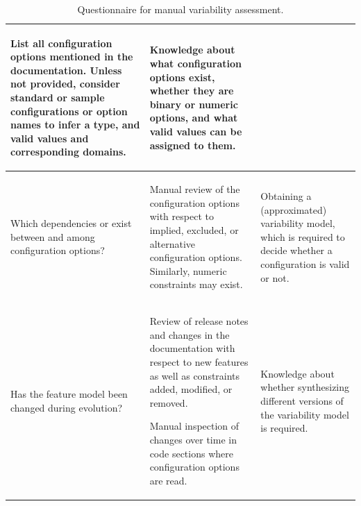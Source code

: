 \begin{table}
\begin{tabular}{L{0.22\textwidth} L{0.48\textwidth} L{0.3\textwidth}}
	{\small\begin{compactitem}
	  \item List all configuration options mentioned in the documentation. Unless
	  not provided, consider standard or sample configurations or option names to
	  infer a type, and valid values and corresponding domains.
	\end{compactitem}} &
	
	{Knowledge about what configuration options exist, whether they are binary or
	numeric options, and what valid values can be assigned to them.}\\
	
	\midrule
	
	{Which dependencies or exist between and among configuration options?} & 
	
	{\small\begin{compactitem}
	  \item Manual review of the configuration options with respect to implied,
	  excluded, or alternative configuration options. Similarly, numeric
	  constraints may exist. 
	\end{compactitem}} &
	
	{Obtaining a (approximated) variability model, which is required to decide
	whether a configuration is valid or not.}\\
	
	\midrule
	
	{Has the feature model been changed during evolution?} & 
	
	{\small\begin{compactitem} 
		\item Review of release notes and changes in the documentation with respect to
		new features as well as constraints added, modified, or removed. 
		\item Manual inspection of changes over time in code sections where
		configuration options are read. 
	\end{compactitem}} & 
	
	{Knowledge about whether synthesizing different versions of the variability
	model is required.}\\
    \bottomrule
  \end{tabular}
  \caption{Questionnaire for manual variability
  assessment.}\label{tab:manual_var_assessment}
\end{table}

